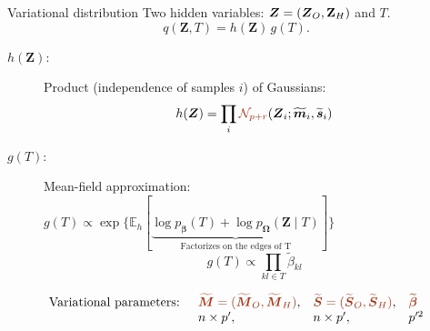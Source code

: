 \documentclass[11pt]{beamer}
\newcommand{\Esp}{{\mathds{E}}}
\newcommand{\betabft}{{\widetilde{\betabf}}}
\newcommand{\betat}{{\widetilde{\beta}}}
\newcommand\Omegab{{\boldsymbol{\Omega}}}
\newcommand\Mb{{\boldsymbol{M}}}
\newcommand\Zb{{\bf Z}}
\newcommand{\betabf}{{\boldsymbol{\beta}}}
\newcommand{\thetabf}{{\boldsymbol{\theta}}}
\newcommand{\Ybf}{{\boldsymbol{Y}}}
\newcommand{\Zbf}{{\boldsymbol{Z}}}
\newcommand{\Sbf}{{\boldsymbol{S}}}
\newcommand{\sbf}{{\boldsymbol{s}}}
\newcommand{\mbf}{{\boldsymbol{m}}}
\newcommand{\emphase}[1]{\textcolor{Complement}{#1}}
\newcommand{\Ncal}{\mathcal{N}}
\begin{document}
%
\begin{frame}{Variational distribution}
 Two hidden variables: $\Zbf=(\Zbf_O, \Zb_H)$ and $T$.
\emphase{$$q(\Zbf, T) = h(\Zbf)\,g(T).$$}
\begin{description}
\item[$h(\Zbf)$:] Product (independence of samples $i$) of Gaussians: 
$$h(\Zbf) = \prod_i \emphase{\Ncal_{p+r}}(\Zbf_i; \widetilde{\mbf}_i,\widetilde{\sbf}_i)$$
\item[$g(T)$:] Mean-field approximation: $g(T) \propto \exp\{\Esp_h[\underbrace{\log p_\betabf ( T) + \log p_\Omegab(\Zbf\mid T)}_{\text{Factorizes on the edges of T}}]\}$
$$g(T)\propto \prod_{kl\in T} \betat_{kl}$$
\end{description}
\pause
\begin{equation*}
\begin{array}{rlll}
\text{Variational parameters: } &\emphase{\widetilde{\Mb}=(\widetilde{\Mb}_O, \widetilde{\Mb}_H)},& \emphase{\widetilde{\Sbf}=(\widetilde{\Sbf}_O, \widetilde{\Sbf}_H)}, &\emphase{\betabft}\\
&{ n\times p',} &n\times p', &p'^2
\end{array}
\end{equation*}
\end{frame}
\end{document}
